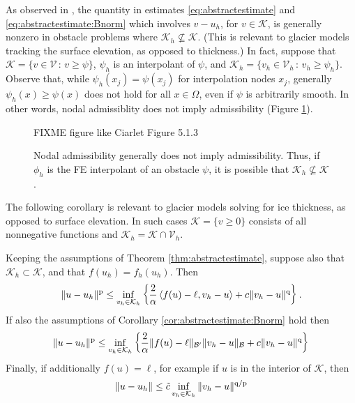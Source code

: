\documentclass[hidelinks,onefignum,onetabnum,final]{siamart220329}  %
\newcommand{\cB}{\mathcal{B}}
\newcommand{\cK}{\mathcal{K}}
\newcommand{\cV}{\mathcal{V}}
\newcommand{\pp}{{\text{\textnormal{p}}}}
\newcommand{\qq}{{\text{\textnormal{q}}}}
\newcommand{\ip}[2]{\left<#1,#2\right>}
\begin{document}
As observed in \cite{Ciarlet2002}, the quantity in estimates \eqref{eq:abstractestimate} and \eqref{eq:abstractestimate:Bnorm} which involves $v-u_h$, for $v\in\cK$, is generally nonzero in obstacle problems where $\cK_h \nsubseteq \cK$.  (This is relevant to glacier models tracking the surface elevation, as opposed to thickness.)  In fact, suppose that $\cK=\{v \in \cV\,:\,v\ge \psi\}$, $\psi_h$ is an interpolant of $\psi$, and $\cK_h=\{v_h \in \cV_h\,:\,v_h\ge \psi_h\}$.  Observe that, while $\psi_h(x_j)=\psi(x_j)$ for interpolation nodes $x_j$, generally $\psi_h(x) \ge \psi(x)$ does not hold for all $x\in\Omega$, even if $\psi$ is arbitrarily smooth.  In other words, nodal admissiblity does not imply admissibility (Figure \ref{fig:nonadmissible}).

\begin{figure}
\begin{center}
FIXME figure like Ciarlet Figure 5.1.3 %
\end{center}
\caption{Nodal admissibility generally does not imply admissibility.  Thus, if $\phi_h$ is the FE interpolant of an obstacle $\psi$, it is possible that $\cK_h \nsubseteq \cK$.}
\label{fig:nonadmissible}
\end{figure}

The following corollary is relevant to glacier models solving for ice thickness, as opposed to surface elevation.  In such cases $\cK = \{v\ge 0\}$ consists of all nonnegative functions and $\cK_h=\cK\cap\cV_h$.

\begin{corollary}  \label{cor:abstractestimate:subset}  Keeping the assumptions of Theorem \ref{thm:abstractestimate}, suppose also that $\cK_h \subset \cK$, and that $f(u_h)=f_h(u_h)$.  Then
\begin{equation}
\|u-u_h\|^\pp \le  \inf_{v_h\in\cK_h} \left\{\frac{2}{\alpha} \ip{f(u)-\ell}{v_h-u} + c \|v_h - u\|^\qq\right\}. \label{eq:abstractestimate:subset}
\end{equation}
If also the assumptions of Corollary \ref{cor:abstractestimate:Bnorm} hold then
\begin{equation}
\|u-u_h\|^\pp \le \inf_{v_h\in\cK_h} \left\{\frac{2}{\alpha} \|f(u)-\ell\|_{\cB'} \|v_h-u\|_{\cB} + c \|v_h-u\|^\qq\right\} \label{eq:abstractestimate:subset:Bnorm}
\end{equation}
Finally, if additionally $f(u)=\ell$, for example if $u$ is in the interior of $\cK$, then
\begin{equation}
\|u-u_h\| \le \tilde c \inf_{v_h\in\cK_h} \|v_h-u\|^{\qq/\pp} \label{eq:abstractestimate:subset:Cea}
\end{equation}
\end{corollary}
\end{document}
